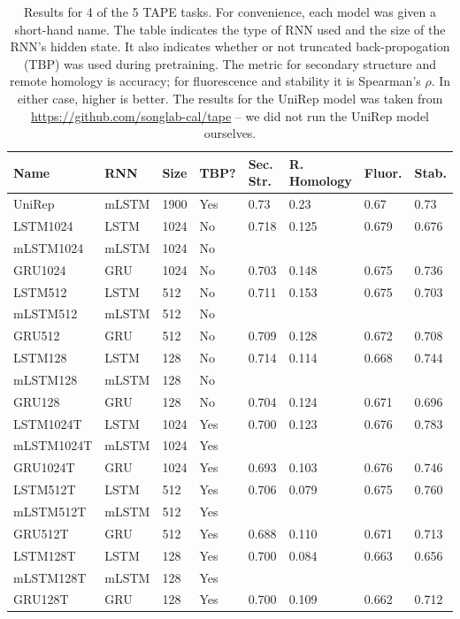 \documentclass[a4paper,12pt]{article}
\begin{document}
\begin{table}[H]
\centering
{}
\begin{tabularx}{\linewidth}{Llllllll}
\toprule
\textbf{Name} & \textbf{RNN} & \textbf{Size} & \textbf{TBP?} & \textbf{Sec. Str.} & \textbf{R. Homology} & \textbf{Fluor.} & \textbf{Stab.} \\ \hline
UniRep     & mLSTM & 1900 & Yes  & 0.73   & 0.23  & 0.67  & 0.73  \\
LSTM1024   & LSTM  & 1024 & No   & 0.718  & 0.125 & 0.679 & 0.676 \\
mLSTM1024  & mLSTM & 1024 & No   &        &       &       &       \\
GRU1024    & GRU   & 1024 & No   & 0.703  & 0.148 & 0.675 & 0.736 \\
LSTM512    & LSTM  & 512  & No   & 0.711  & 0.153 & 0.675 & 0.703 \\
mLSTM512   & mLSTM & 512  & No   &        &       &       &       \\
GRU512     & GRU   & 512  & No   & 0.709  & 0.128 & 0.672 & 0.708 \\
LSTM128    & LSTM  & 128  & No   & 0.714  & 0.114 & 0.668 & 0.744 \\
mLSTM128   & mLSTM & 128  & No   &        &       &       &       \\
GRU128     & GRU   & 128  & No   & 0.704  & 0.124 & 0.671 & 0.696 \\
LSTM1024T  & LSTM  & 1024 & Yes  & 0.700  & 0.123 & 0.676 & 0.783 \\
mLSTM1024T & mLSTM & 1024 & Yes  &        &       &       &       \\
GRU1024T   & GRU   & 1024 & Yes  & 0.693  & 0.103 & 0.676 & 0.746 \\
LSTM512T   & LSTM  & 512  & Yes  & 0.706  & 0.079 & 0.675 & 0.760 \\
mLSTM512T  & mLSTM & 512  & Yes  &        &       &       &       \\
GRU512T    & GRU   & 512  & Yes  & 0.688  & 0.110 & 0.671 & 0.713 \\
LSTM128T   & LSTM  & 128  & Yes  & 0.700  & 0.084 & 0.663 & 0.656 \\
mLSTM128T  & mLSTM & 128  & Yes  &        &       &       &       \\
GRU128T    & GRU   & 128  & Yes  & 0.700  & 0.109 & 0.662 & 0.712 \\ \bottomrule
\end{tabularx}
\caption{Results for 4 of the 5 TAPE tasks. For convenience, each model was given a short-hand name. The table indicates the type of RNN used and the size of the RNN's hidden state. It also indicates whether or not truncated back-propogation (TBP) was used during pretraining. The metric for secondary structure and remote homology is accuracy; for fluorescence and stability it is Spearman's $\rho$. In either case, higher is better. The results for the UniRep model was taken from \url{https://github.com/songlab-cal/tape} -- we did not run the UniRep model ourselves.}
\label{table:taperesults}
\end{table}
\end{document}
